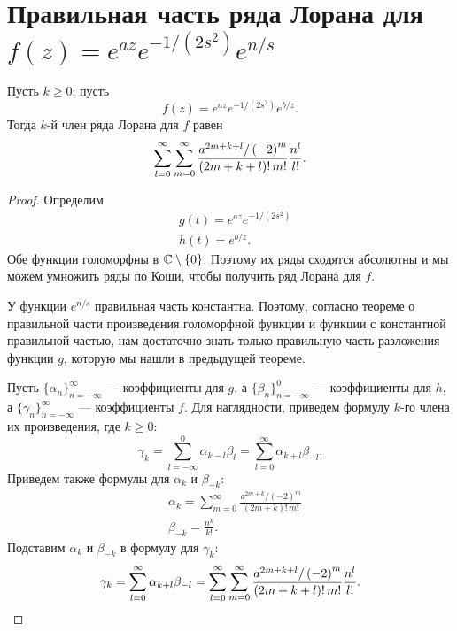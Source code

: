\section{Правильная часть ряда Лорана для $f(z) = e^{az} e^{-1/(2s^2)} e^{n/s}$}
\begin{Th*}
Пусть $k \ge 0$; пусть
\[
    f(z) = e^{az} e^{-1/(2s^2)} e^{b/z}
.\]
Тогда $k$-й член ряда Лорана для $f$ равен
\[
    \sum_{l=0}^{\infty}
    \sum_{m=0}^{\infty} \frac{a^{2m+k+l} / \left( -2 \right)^m}{(2m+k+l)!\,m!} \\
    \frac{n^l}{l!}
.\]
\end{Th*}
\begin{proof}
Определим
\begin{align*}
    & g(t) = e^{az} e^{-1/(2s^2)} \\
    & h(t) = e^{b/z}
.\end{align*}
Обе функции голоморфны в $\mathbb{C} \setminus \{0\}$. Поэтому их ряды сходятся абсолютны и мы можем умножить ряды по Коши, чтобы получить ряд Лорана для $f$.

У функции $e^{n/s}$ правильная часть константна.
Поэтому, согласно теореме о правильной части произведения голоморфной функции и функции с константной правильной частью, 
нам достаточно знать только правильную часть разложения функции $g$, которую мы нашли в предыдущей теореме.

Пусть $\{\alpha_n\}_{n=-\infty}^\infty$ --- коэффициенты для $g$, а $\{\beta_n\}_{n=-\infty}^0$ --- коэффициенты для $h$, а $\{\gamma_n\}_{n=-\infty}^\infty$ --- коэффициенты $f$.
Для наглядности, приведем формулу $k$-го члена их произведения, где $k \ge 0$:
\[
    \gamma_k =
    \sum_{l=-\infty}^{0} \alpha_{k-l} \beta_l =
    \sum_{l=0}^{\infty} \alpha_{k+l} \beta_{-l}
.\]
Приведем также формулы для $\alpha_k$ и $\beta_{-k}$:
\begin{align*}
    & \alpha_k = \sum_{m=0}^{\infty} \frac{a^{2m+k} / \left( -2 \right)^m}{(2m+k)!\,m!} \\
    & \beta_{-k} = \frac{n^k}{k!}
.\end{align*}
Подставим $\alpha_k$ и $\beta_{-k}$ в формулу для $\gamma_k$:
\[
    \gamma_k =
    \sum_{l=0}^{\infty} \alpha_{k+l} \beta_{-l} =
%
    \sum_{l=0}^{\infty}
    \sum_{m=0}^{\infty} \frac{a^{2m+k+l} / \left( -2 \right)^m}{(2m+k+l)!\,m!} \\
    \frac{n^l}{l!}
.\]
\end{proof}

